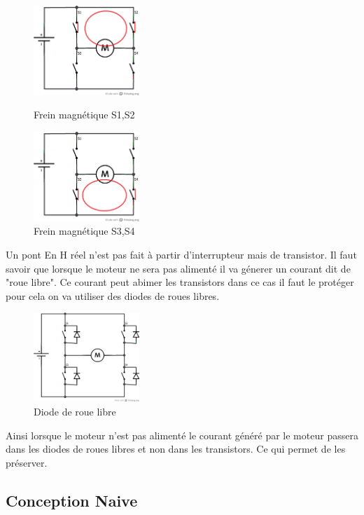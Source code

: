 \documentclass[10pt,a4paper]{article}
\begin{document}
\begin{figure}[!h]
   \begin{minipage}[c]{.50\linewidth}
      \centering
      \includegraphics[width=4cm]{images/pontH4}
      \caption{\label{pontH4} Frein magnétique S1,S2}
   \end{minipage}
   \begin{minipage}[c]{.50\linewidth}
      \centering
      \includegraphics[width=4cm]{images/pontH5}
      \caption{\label{pontH5} Frein magnétique S3,S4}
   \end{minipage}
\end{figure}

Un pont En H réel n'est pas fait à partir d'interrupteur mais de transistor. Il faut savoir que
lorsque le moteur ne sera pas alimenté il va génerer un courant dit de "roue libre". Ce courant peut
abimer les transistors dans ce cas il faut le protéger pour cela on va utiliser des diodes de roues
libres.

\begin{figure}[!h]
   \centering
   \includegraphics[width=4cm]{images/pontHDiodes}
   \caption{\label{pontH4} Diode de roue libre}
\end{figure}

Ainsi lorsque le moteur n'est pas alimenté le courant généré par le moteur passera dans les diodes
de roues libres	et non dans les transistors. Ce qui permet de les préserver.

\subsection{Conception Naive}
\end{document}
